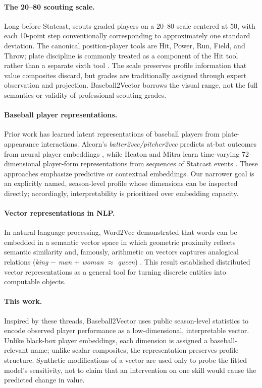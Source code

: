 \documentclass[10pt,twocolumn,letterpaper]{article}
\begin{document}
\paragraph{The 20--80 scouting scale.}
Long before Statcast, scouts graded players on a 20--80 scale centered at 50, with each 10-point step conventionally corresponding to approximately one standard deviation. The canonical position-player tools are Hit, Power, Run, Field, and Throw; plate discipline is commonly treated as a component of the Hit tool rather than a separate sixth tool \cite{mcdaniel2014}. The scale preserves profile information that value composites discard, but grades are traditionally assigned through expert observation and projection. Baseball2Vector borrows the visual range, not the full semantics or validity of professional scouting grades.

\paragraph{Baseball player representations.}
Prior work has learned latent representations of baseball players from plate-appearance interactions. Alcorn's \emph{batter2vec/pitcher2vec} predicts at-bat outcomes from neural player embeddings \cite{alcorn2016}, while Heaton and Mitra learn time-varying 72-dimensional player-form representations from sequences of Statcast events \cite{heaton2021}. These approaches emphasize predictive or contextual embeddings. Our narrower goal is an explicitly named, season-level profile whose dimensions can be inspected directly; accordingly, interpretability is prioritized over embedding capacity.

\paragraph{Vector representations in NLP.}
In natural language processing, Word2Vec demonstrated that words can be embedded in a semantic vector space in which geometric proximity reflects semantic similarity and, famously, arithmetic on vectors captures analogical relations (\emph{king} $-$ \emph{man} $+$ \emph{woman} $\approx$ \emph{queen}) \cite{mikolov2013}. This result established distributed vector representations as a general tool for turning discrete entities into computable objects.

\paragraph{This work.}
Inspired by these threads, Baseball2Vector uses public season-level statistics to encode observed player performance as a low-dimensional, interpretable vector. Unlike black-box player embeddings, each dimension is assigned a baseball-relevant name; unlike scalar composites, the representation preserves profile structure. Synthetic modifications of a vector are used only to probe the fitted model's sensitivity, not to claim that an intervention on one skill would cause the predicted change in value.
\end{document}
